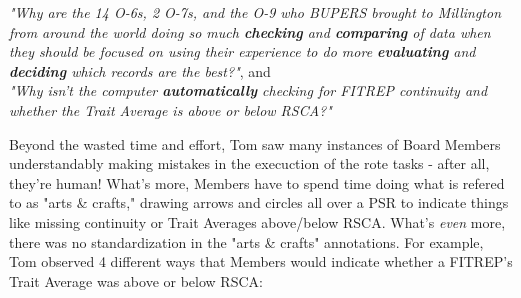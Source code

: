 \documentclass[UTF8]{article}
\begin{document}
\begin{adjustwidth}{35pt}{35pt}



\indent \indent \textit{"Why are the 14 O-6s, 2 O-7s, and the O-9 who BUPERS brought
to Millington from around the world doing so much \textbf{checking} and
\textbf{comparing} of data when they should be focused on using their experience to
do more \textbf{evaluating} and \textbf{deciding} which records are the best?"}, and
\\

\indent \textit{"Why isn't the computer \textbf{automatically} checking for FITREP
continuity and whether the Trait Average is above or below RSCA?"}\\

\end{adjustwidth}

Beyond the wasted time and effort, Tom saw many instances of Board Members
understandably making mistakes in the execuction of the rote tasks - after all,
they're human! What's more, Members have to spend time doing what is refered to as
"arts \& crafts," drawing arrows and circles all over a PSR to indicate things like
missing continuity or Trait Averages above/below RSCA. What's \textit{even} more,
there was no standardization in the "arts \& crafts" annotations. For example, Tom
observed 4 different ways that Members would indicate whether a FITREP's Trait
Average was above or below RSCA:
\end{document}
